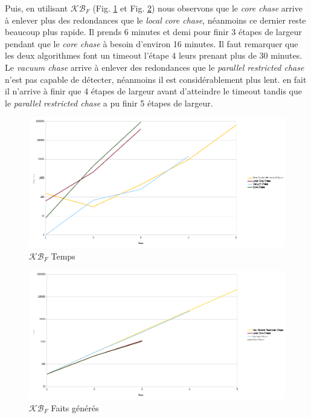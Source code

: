 Puis, en utilisant $\mathcal{KB}_F$ (Fig. \ref{fig:mnewtime} et Fig. \ref{fig:mnewfacts}) nous observons que le \textit{core chase} arrive à enlever plus des redondances que le \textit{local core chase}, néanmoins ce dernier reste beaucoup plus rapide. Il prends 6 minutes et demi pour finir 3 étapes de largeur pendant que le \textit{core chase} à besoin d'environ 16 minutes. Il faut remarquer que les deux algorithmes font un timeout l'étape 4 leurs prenant plus de 30 minutes. Le \textit{vacuum chase} arrive à enlever des redondances que le \textit{parallel restricted chase} n'est pas capable de détecter, néanmoins il est considérablement plus lent. en fait il n'arrive à finir que 4 étapes de largeur avant d'atteindre le timeout tandis que le \textit{parallel restricted chase} a pu finir 5 étapes de largeur. 

\begin{figure}
\centering
\includegraphics[width=\textwidth]{pictures/benchmark_new/mnewtimes.png}
\caption{$\mathcal{KB}_F$ Temps}
\label{fig:mnewtime}
\end{figure}

\begin{figure}
\centering
\includegraphics[width=\textwidth]{pictures/benchmark_new/mnewfacts.png}
\caption{$\mathcal{KB}_F$ Faits générés}
\label{fig:mnewfacts}
\end{figure}

